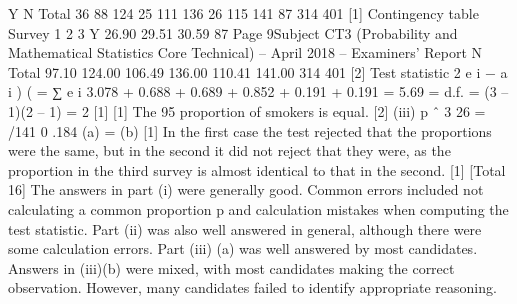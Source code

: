 \documentclass[a4paper,12pt]{article}
\begin{document}
\begin{enumerate}
Y
N
Total 36
88
124 25
111
136 26
115
141
87
314
401
[1]
Contingency table
Survey 1 2 3
Y 26.90 29.51 30.59
87
Page 9Subject CT3 (Probability and Mathematical Statistics Core Technical) – April 2018 – Examiners’ Report
N
Total
97.10
124.00
106.49
136.00
110.41
141.00
314
401
[2]
Test statistic
2
e i − a i )
(
=
∑
e i
3.078 + 0.688 + 0.689 + 0.852 + 0.191 + 0.191 =
5.69
=
d.f. = (3 – 1)(2 – 1) = 2
[1]
[1]
The 95%
proportion of smokers is equal.
[2]
(iii)
p ˆ 3 26
=
/141 0 .184
(a) =
(b)
[1]
In the first case the test rejected that the proportions were the same, but
in the second it did not reject that they were, as the proportion in the
third survey is almost identical to that in the second.
[1]
[Total 16]
The answers in part (i) were generally good. Common errors included not calculating a common proportion p and calculation mistakes when
computing the test statistic. Part (ii) was also well answered in general, although there were some calculation errors. Part (iii) (a) was well
answered by most candidates. Answers in (iii)(b) were mixed, with most candidates making the correct observation. However, many candidates
failed to identify appropriate reasoning.


\end{enumerate}
\end{document}
